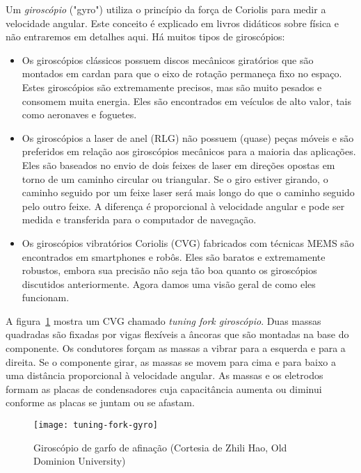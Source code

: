 {Um \emph{giroscópio} ("gyro") utiliza o princípio da força de Coriolis para medir a velocidade angular. Este conceito é explicado em livros didáticos sobre física e não entraremos em detalhes aqui. Há muitos tipos de giroscópios:
\begin{itemize}
\item Os giroscópios clássicos possuem discos mecânicos giratórios que são montados em cardan para que o eixo de rotação permaneça fixo no espaço. Estes giroscópios são extremamente precisos, mas são muito pesados e consomem muita energia. Eles são encontrados em veículos de alto valor, tais como aeronaves e foguetes.
\item Os giroscópios a laser de anel (RLG) não possuem (quase) peças móveis e são preferidos em relação aos giroscópios mecânicos para a maioria das aplicações. Eles são baseados no envio de dois feixes de laser em direções opostas em torno de um caminho circular ou triangular. Se o giro estiver girando, o caminho seguido por um feixe laser será mais longo do que o caminho seguido pelo outro feixe. A diferença é proporcional à velocidade angular e pode ser medida e transferida para o computador de navegação.
\item Os giroscópios vibratórios Coriolis (CVG) fabricados com técnicas MEMS são encontrados em smartphones e robôs. Eles são baratos e extremamente robustos, embora sua precisão não seja tão boa quanto os giroscópios discutidos anteriormente. Agora damos uma visão geral de como eles funcionam.
\end{itemize}

A figura~\ref{fig.tuning-gyro-image} mostra um CVG chamado \emph{tuning fork giroscópio}. Duas massas quadradas são fixadas por vigas flexíveis a âncoras que são montadas na base do componente. Os condutores forçam as massas a vibrar para a esquerda e para a direita. Se o componente girar, as massas se movem para cima e para baixo a uma distância proporcional à velocidade angular. As massas e os eletrodos formam as placas de condensadores cuja capacitância aumenta ou diminui conforme as placas se juntam ou se afastam.

\begin{figure}
\begin{center}
\texttt{[image: tuning-fork-gyro]}
\end{center}
\caption{Giroscópio de garfo de afinação (Cortesia de Zhili Hao, Old Dominion University)}\label{fig.tuning-gyro-image}
\end{figure}

}
